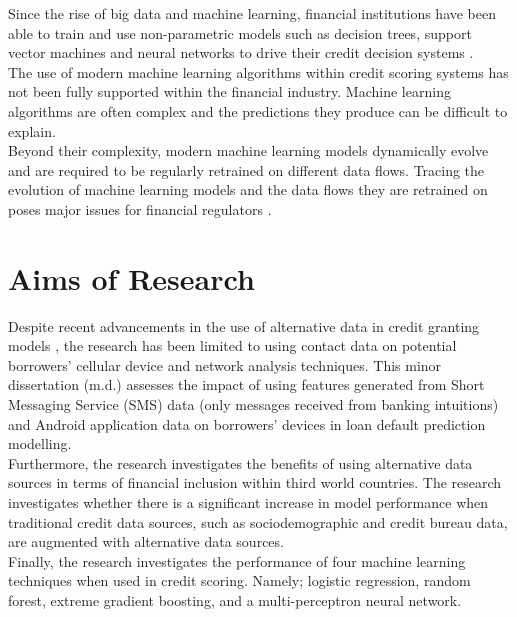 Since the rise of big data and machine learning, financial institutions have been able to train and use non-parametric models such as decision trees, support vector machines and neural networks to drive their credit decision systems \parencite{IntroToCreditModelling}. \\

The use of modern machine learning algorithms within credit scoring systems has not been fully supported within the financial industry. Machine learning algorithms are often complex and the predictions they produce can be difficult to explain. \\

Beyond their complexity, modern machine learning models dynamically evolve and are required to be regularly retrained on different data flows. Tracing the evolution of machine learning models and the data flows they are retrained on poses major issues for financial regulators \parencite{Regulation}. \\


\section{Aims of Research}

Despite recent advancements in the use of alternative data in credit granting models \parencite{BigDataMicroFiance}, the research has been limited to using contact data on potential borrowers' cellular device and network analysis techniques. This minor dissertation (m.d.) assesses the impact of using features generated from Short Messaging Service (SMS) data (only messages received from banking intuitions) and Android application data on borrowers' devices in loan default prediction modelling. \\

Furthermore, the research investigates the benefits of using alternative data sources in terms of financial inclusion within third world countries. The research investigates whether there is a significant increase in model performance when traditional credit data sources, such as sociodemographic and credit bureau data, are augmented with alternative data sources.  \\

Finally, the research investigates the performance of four machine learning techniques when used in credit scoring. Namely; logistic regression, random forest, extreme gradient boosting, and a multi-perceptron neural network. 

